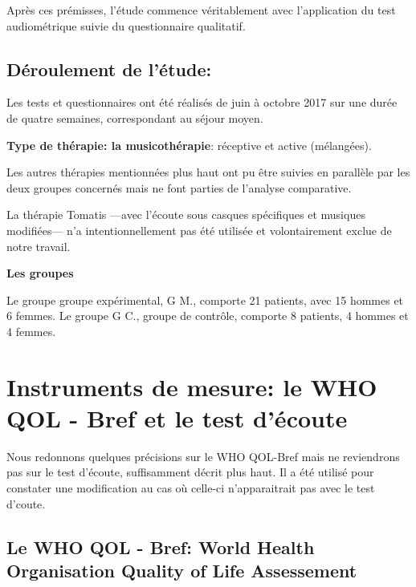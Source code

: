Après ces prémisses, l'étude commence véritablement avec l'application du test
audiométrique suivie du questionnaire qualitatif.

\subsection{Déroulement de l'étude:}

Les tests et questionnaires  ont été réalisés de juin à octobre 2017 sur une durée de quatre semaines, correspondant au séjour moyen.

\textbf{Type de thérapie: la musicothérapie}: réceptive  et active
(mélangées).

Les autres thérapies mentionnées plus haut ont pu être suivies en parallèle par les deux
groupes concernés mais ne font parties de l'analyse comparative.

 La thérapie Tomatis ---avec l'écoute sous casques spécifiques et
 musiques modifiées--- n'a intentionnellement pas été utilisée et
 volontairement exclue de notre travail.



\textbf{Les groupes}

Le groupe groupe expérimental, G M., comporte 21 patients, avec 15 hommes et 6
femmes.
Le groupe G C., groupe de contrôle, comporte 8 patients, 4 hommes et
4 femmes.






 
 
 

\section{Instruments de mesure: le WHO QOL - Bref et le test d'écoute}
 Nous redonnons quelques précisions sur le WHO QOL-Bref mais ne
 reviendrons pas sur le test d'écoute, suffisamment décrit plus haut. Il a été
 utilisé pour constater une modification au cas où celle-ci
 n'apparaitrait pas avec le test d'coute.

 \subsection{Le WHO QOL - Bref:  World Health
   Organisation Quality of Life Assessement }
 
